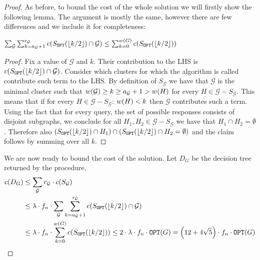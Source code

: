 \begin{theorem}
\begin{proof}
        As before, to bound the cost of the whole solution we will firstly show the following lemma. The argument is mostly the same, however there are few differences and we include it for completeness:
            \begin{lemma}
            $\sum_{\mathcal{G}}\sum_{k=a_{\mathcal{G}}+1}^{r_{\mathcal{G}}}c\mathopen{}\left( S_{\texttt{OPT}}\mathopen{}\left( \mathopen{}\left\lfloor k/2 \right\rfloor \right)\cap \mathcal{G} \right)\leq \sum_{k=0}^{w\mathopen{}\left( G \right)}c\mathopen{}\left( S_{\texttt{OPT}}\mathopen{}\left( \mathopen{}\left\lfloor k/2 \right\rfloor \right) \right)$
            \begin{proof}
                Fix a value of $\mathcal{G}$ and $k$. Their contribution to the LHS is $c\mathopen{}\left( S_{\texttt{OPT}}\mathopen{}\left( \mathopen{}\left\lfloor k/2 \right\rfloor \right)\cap \mathcal{G} \right)$. Consider which clusters for which the algorithm is called contribute such term to the LHS. By definition of $S_{\mathcal{G}}$ we have that $\mathcal{G}$ is the minimal cluster such that $w\mathopen{}\left( \mathcal{G} \right)\geq k\geq a_{\mathcal{G}}+1 >w\mathopen{}\left( H \right)$ for every $H\in \mathcal{G}-S_{\mathcal{G}}$. This means that if for every $H\in \mathcal{G}-S_{\mathcal{G}}$: $w\mathopen{}\left( H \right)<k$ then $\mathcal{G}$ contributes such a term. Using the fact that for every query, the set of possible responses consists of disjoint subgraphs, we conclude for all $H_1, H_2\in \mathcal{G}-S_{\mathcal{G}}$ we have that $H_1\cap H_2=\emptyset$. Therefore also $\mathopen{}\left( S_{\texttt{OPT}}\mathopen{}\left( \mathopen{}\left\lfloor k/2 \right\rfloor \right)\cap H_1 \right)\cap \mathopen{}\left( S_{\texttt{OPT}}\mathopen{}\left( \mathopen{}\left\lfloor k/2 \right\rfloor \right)\cap H_2=\emptyset \right)$ and the claim follows by summing over all $k$.
            \end{proof}
            \end{lemma}
        We are now ready to bound the cost of the solution. Let $D_G$ be the decision tree returned by the procedure.
        \begin{align*}
            c\mathopen{}\left( D_{G} \right)&\leq \sum_{\mathcal{G}}r_{\mathcal{G}}\cdot c\mathopen{}\left( S_{\mathcal{G}} \right)\\
            &\leq \lambda \cdot f_n\cdot \sum_{\mathcal{G}}\sum_{k=a_{\mathcal{G}}+1}^{r_{\mathcal{G}}}c\mathopen{}\left( S_{\texttt{OPT}}\mathopen{}\left( \mathopen{}\left\lfloor k/2 \right\rfloor \right)\cap \mathcal{G} \right)\\
            &\leq
            \lambda \cdot f_n\cdot\sum_{k=0}^{w\mathopen{}\left( G \right)}c\mathopen{}\left( S_{\texttt{OPT}}\mathopen{}\left( \mathopen{}\left\lfloor k/2 \right\rfloor \right) \right) \leq 2\cdot \lambda \cdot f_n\cdot \texttt{OPT}\mathopen{}\left( G \right) = \mathopen{}\left( 12+4\sqrt{5} \right)\cdot f_n \cdot \texttt{OPT}\mathopen{}\left( G \right)
        \end{align*}
        
    \end{proof}
    
\end{theorem}
